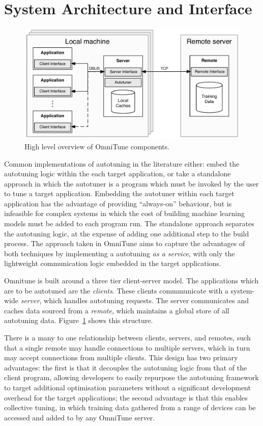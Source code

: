 \section{System Architecture and Interface}

\begin{figure}
\centering
\includegraphics[width=.9\textwidth]{img/omnitune-system-overview.pdf}
\caption[OmniTune system diagram]{%
  High level overview of OmniTune components.%
}
\label{fig:omnitune-system-overview}
\end{figure}

Common implementations of autotuning in the literature either: embed
the autotuning logic within the each target application, or take a
standalone approach in which the autotuner is a program which must be
invoked by the user to tune a target application. Embedding the
autotuner within each target application has the advantage of
providing ``always-on'' behaviour, but is infeasible for complex
systems in which the cost of building machine learning models must be
added to each program run. The standalone approach separates the
autotuning logic, at the expense of adding one additional step to the
build process. The approach taken in OmniTune aims to capture the
advantages of both techniques by implementing a autotuning \emph{as a
  service}, with only the lightweight communication logic embedded in
the target applications.

Omnitune is built around a three tier client-server model. The
applications which are to be autotuned are the \emph{clients}. These
clients commmunicate with a system-wide \emph{server}, which handles
autotuning requests. The server communicates and caches data sourced
from a \emph{remote}, which maintains a global store of all autotuning
data. Figure~\ref{fig:omnitune-system-overview} shows this structure.

There is a many to one relationship between clients, servers, and
remotes, such that a single remote may handle connections to multiple
servers, which in turn may accept connections from multiple
clients. This design has two primary advantages: the first is that it
decouples the autotuning logic from that of the client program,
allowing developers to easily repurpose the autotuning framework to
target additional optimisation parameters without a significant
development overhead for the target applications; the second advantage
is that this enables collective tuning, in which training data
gathered from a range of devices can be accessed and added to by any
OmniTune server.

